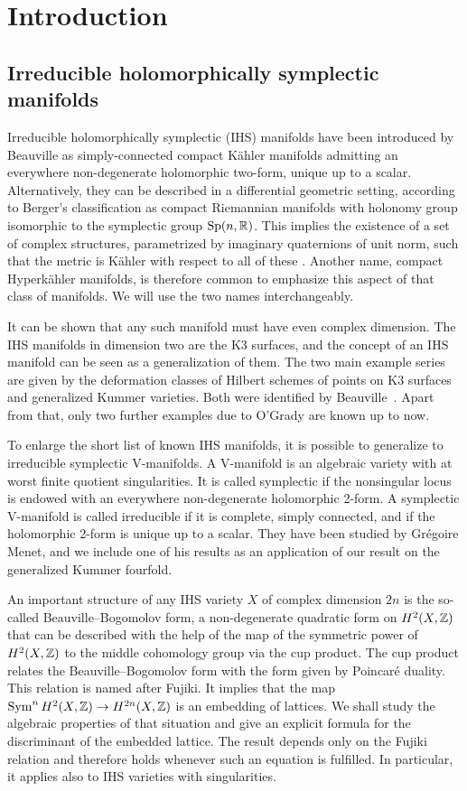 \chapter{Introduction}
\section{Irreducible holomorphically symplectic manifolds}
Irreducible holomorphically symplectic (IHS) manifolds have been introduced by Beauville \cite{Beauville} as simply-connected compact K\"ahler manifolds admitting an everywhere non-degenerate holomorphic two-form, unique up to a scalar. 
Alternatively, they can be described in a differential geometric setting, according to Berger's classification as compact Riemannian manifolds with holonomy group isomorphic to the symplectic group $\operatorname{Sp}(n,\mathbb{R})$. This implies the existence of a set of complex structures, parametrized by imaginary quaternions of unit norm, such that the metric is K\"ahler with respect to all of these \cite[Sect.~23]{Huybrechts}. 
Another name, compact Hyperk\"ahler manifolds, is therefore common to emphasize this aspect of that class of manifolds. We will use the two names interchangeably.

It can be shown that any such manifold must have even complex dimension. The IHS manifolds in dimension two are the K3 surfaces, and the concept of an IHS manifold can be seen as a generalization of them. The two main example series are given by the deformation classes of Hilbert schemes of points on K3 surfaces and generalized Kummer varieties. Both were identified by Beauville~\cite{Beauville}. Apart from that, only two further examples due to O'Grady are known up to now.

To enlarge the short list of known IHS manifolds, it is possible to generalize to irreducible symplectic V-manifolds. A V-manifold is an algebraic variety with at worst finite quotient singularities. It is called symplectic if the nonsingular locus is endowed with an everywhere non-degenerate holomorphic 2-form. 
A symplectic V-manifold is called irreducible if it is complete, simply connected, and if the holomorphic 2-form is unique up to a scalar. They have been studied by Gr\'egoire Menet, and we include one of his results as an application of our result on the generalized Kummer fourfold.

An important structure of any IHS variety $X$ of complex dimension $2n$ is the so-called Beauville--Bogomolov form, a non-degenerate quadratic form on $H^2(X,\mathbb{Z})$ that can be described with the help of the map of the symmetric power of $H^2(X,\mathbb{Z})$ to the middle cohomology group via the cup product. The cup product relates the Beauville--Bogomolov form with the form given by Poincar\'e duality. This relation is named after Fujiki. It implies that the map $\operatorname{Sym}^n H^2(X,\mathbb{Z})\rightarrow H^{2n}(X,\mathbb{Z})$ is an embedding of lattices. We shall study the algebraic properties of that situation and give an explicit formula for the discriminant of the embedded lattice. The result depends only on the Fujiki relation and therefore holds whenever such an equation is fulfilled. In particular, it applies also to IHS varieties with singularities.

